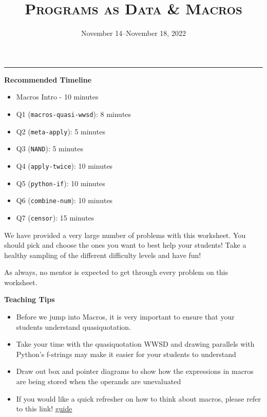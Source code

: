 \documentclass{exam}
\title{\textsc{Programs as Data \& Macros}}
\date{November 14--November 18, 2022}
\begin{document}
\maketitle
\rule{\textwidth}{0.15em}

\begin{meta}
\begin{blocksection}
    \textbf{Recommended Timeline}
    \begin{itemize}
        \item Macros Intro - 10 minutes
        \item Q1 (\lstinline{macros-quasi-wwsd}): 8 minutes
        \item Q2 (\lstinline{meta-apply}): 5 minutes
        \item Q3 (\lstinline{NAND}): 5 minutes
        \item Q4 (\lstinline{apply-twice}): 10 minutes
        \item Q5 (\lstinline{python-if}): 10 minutes
        \item Q6 (\lstinline{combine-num}): 10 minutes
        \item Q7 (\lstinline{censor}): 15 minutes 
    \end{itemize}
\end{blocksection}
\end{meta}
We have provided a very large number of problems with this worksheet. You should pick and choose the ones you want to best help your students! Take a healthy sampling of the different difficulty levels and have fun!

As always, no mentor is expected to get through every problem on this worksheet. 
\begin{meta}
\textbf{Teaching Tips}
\begin{itemize}
    \item Before we jump into Macros, it is very important to ensure that your students understand quasiquotation.
    \item Take your time with the quasiquotation WWSD and drawing parallels with Python's f-strings may make it easier for your students to understand 
    \item Draw out box and pointer diagrams to show how the expressions in macros are being stored when the operands are unevaluated
    \item If you would like a quick refresher on how to think about macros, please refer to this link! \href{https://docs.google.com/document/d/1JSbvtJ5bYUEhovDZd_gQnBvkG_WDcafmX-4B3QeIXZU/edit}{guide}
\end{itemize}
\end{meta}
\end{document}
